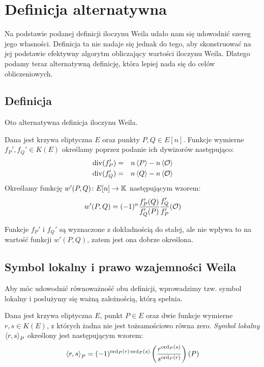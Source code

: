 \section{Definicja alternatywna}

Na podstawie podanej definicji iloczynu Weila
udało nam się udowodnić szereg jego własności.
Definicja ta nie nadaje się jednak do tego,
aby skonstruować na jej podstawie
efektywny algorytm obliczający wartości iloczynu Weila.
Dlatego podamy teraz alternatywną definicję,
która lepiej nada się do celów obliczeniowych.

\subsection*{Definicja}

Oto alternatywna definicja iloczynu Weila.

\begin{definition}\label{weil_pairing_alt_def}
Dana jest krzywa eliptyczna $E$ oraz punkty $P, Q \in E[n]$.
Funkcje wymierne $f_P', f_Q' \in K(E)$
określamy poprzez podanie ich dywizorów
następująco:
\begin{eqnarray*}
\operatorname{div}(f_P') & = & n\left\langle P\right\rangle - n\left\langle\mathcal{O}\right\rangle \\
\operatorname{div}(f_Q') & = & n\left\langle Q\right\rangle - n\left\langle\mathcal{O}\right\rangle
\end{eqnarray*}
Określamy funkcję $w'(P, Q)\colon E[n] \to \mathbb{K}$
następującym wzorem:
\begin{equation}\label{weil_pairing_alt_eqn}
w'(P, Q) = (-1)^n\frac{f_P'(Q)}{f_Q'(P)}\frac{f_Q'}{f_P'}(\mathcal{O})
\end{equation}
\end{definition}

\begin{remark}
Funkcje $f_P'$ i $f_Q'$ są wyznaczone z dokładnością do stałej,
ale nie wpływa to na wartość funkcji $w'(P, Q)$,
zatem jest ona dobrze określona.
\end{remark}

\subsection*{Symbol lokalny i prawo wzajemności Weila}

Aby móc udowodnić równoważność obu definicji,
wprowadzimy tzw. symbol lokalny
i posłużymy się ważną zależnością, którą spełnia.

\begin{definition}
Dana jest krzywa eliptyczna $E$, punkt $P \in E$
oraz dwie funkcje wymierne $r, s \in K(E)$,
z których żadna nie jest tożsamościowo równa zero.
\emph{Symbol lokalny $\left\langle r , s \right\rangle_{P}$}
określony jest następującym wzorem:
\begin{equation}
\left\langle r , s \right\rangle_{P} =
(-1)^{\operatorname{ord}_P(r)\operatorname{ord}_P(s)}\left(\frac{r^{\operatorname{ord}_P(s)}}{s^{\operatorname{ord}_P(r)}}\right)(P)
\end{equation}
\end{definition}

